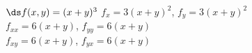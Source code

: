 {$\ds f(x,y) = (x+y)^3$
}
{$f_x=3(x+y)^2$, $f_y=3(x+y)^2$\\
$f_{xx}=6(x+y)$, $f_{yy}=6(x+y)$\\
$f_{xy}=6(x+y)$, $f_{yx}=6(x+y)$\\
}
